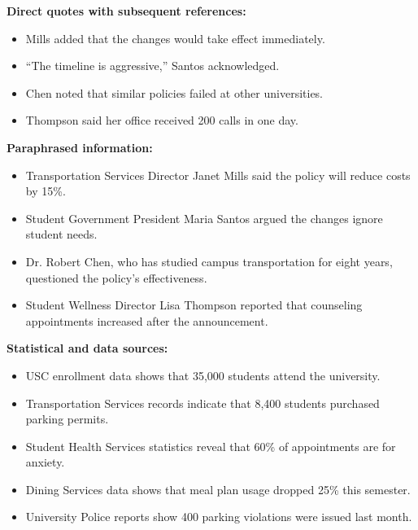 \documentclass[12pt]{article}
\begin{document}
\begin{examplebox}
\textbf{Direct quotes with subsequent references:}
\begin{itemize}
    \item Mills added that the changes would take effect immediately.
    \item ``The timeline is aggressive,'' Santos acknowledged.
    \item Chen noted that similar policies failed at other universities.
    \item Thompson said her office received 200 calls in one day.
\end{itemize}
\end{examplebox}

\begin{examplebox}
\textbf{Paraphrased information:}
\begin{itemize}
    \item Transportation Services Director Janet Mills said the policy will reduce costs by 15\%.
    \item Student Government President Maria Santos argued the changes ignore student needs.
    \item Dr. Robert Chen, who has studied campus transportation for eight years, questioned the policy's effectiveness.
    \item Student Wellness Director Lisa Thompson reported that counseling appointments increased after the announcement.
\end{itemize}
\end{examplebox}

\begin{examplebox}
\textbf{Statistical and data sources:}
\begin{itemize}
    \item USC enrollment data shows that 35,000 students attend the university.
    \item Transportation Services records indicate that 8,400 students purchased parking permits.
    \item Student Health Services statistics reveal that 60\% of appointments are for anxiety.
    \item Dining Services data shows that meal plan usage dropped 25\% this semester.
    \item University Police reports show 400 parking violations were issued last month.
\end{itemize}
\end{examplebox}
\end{document}
